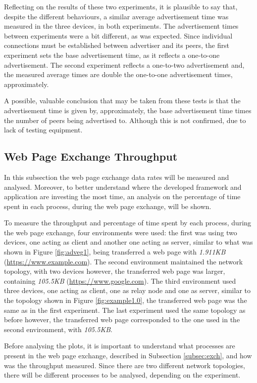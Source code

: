 Reflecting on the results of these two experiments, it is plausible to say that, despite the different behaviours, a similar average advertisement time was measured in the three devices, in both experiments. The advertisement times between experiments were a bit different, as was expected. Since individual connections must be established between advertiser and its peers, the first experiment sets the base advertisement time, as it reflects a one-to-one advertisement. The second experiment reflects a one-to-two advertisement and, the measured average times are double the one-to-one advertisement times, approximately.

A possible, valuable conclusion that may be taken from these tests is that the advertisement time is given by, approximately, the base advertisement time times the number of peers being advertised to. Although this is not confirmed, due to lack of testing equipment.

\subsection{Web Page Exchange Throughput}

In this subsection the web page exchange data rates will be measured and analysed. Moreover, to better understand where the developed framework and application are investing the most time, an analysis on the percentage of time spent in each process, during the web page exchange, will be shown.

To measure the throughput and percentage of time spent by each process, during the web page exchange, four environments were used: the first was using two devices, one acting as client and another one acting as server, similar to what was shown in Figure \ref{fig:adveg1}, being transferred a web page with \textit{1.911KB} (\url{https://www.example.com}). The second environment maintained the network topology, with two devices however, the transferred web page was larger, containing \textit{105.5KB} (\url{https://www.google.com}). The third environment used three devices, one acting as client, one as relay node and one as server, similar to the topology shown in Figure \ref{fig:example1.0}, the transferred web page was the same as in the first experiment. The last experiment used the same topology as before however, the transferred web page corresponded to the one used in the second environment, with \textit{105.5KB}.

Before analysing the plots, it is important to understand what processes are present in the web page exchange, described in Subsection \ref{subsec:exch}, and how was the throughput measured. Since there are two different network topologies, there will be different processes to be analysed, depending on the experiment.

